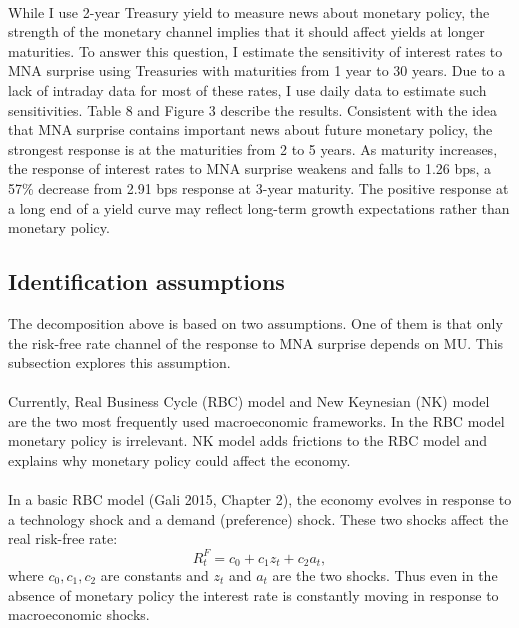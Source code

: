 \documentclass[12pt]{article}
\begin{document}
\paragraph{}
While I use 2-year Treasury yield to measure news about monetary policy, the strength of the monetary channel implies that it should affect yields at longer maturities. To answer this question, I estimate the sensitivity of interest rates to MNA surprise using Treasuries with maturities from 1 year to 30 years. Due to a lack of intraday data for most of these rates, I use daily data to estimate such sensitivities. Table 8 and Figure 3 describe the results. Consistent with the idea that MNA surprise contains important news about future monetary policy, the strongest response is at the maturities from 2 to 5 years. As maturity increases, the response of interest rates to MNA surprise weakens and falls to 1.26 bps, a 57\% decrease from 2.91 bps response at 3-year maturity. The positive response at a long end of a yield curve may reflect long-term growth expectations rather than monetary policy. 


\subsection{Identification assumptions} 
\label{sec:Model}

The decomposition above is based on two assumptions. One of them is that only the risk-free rate channel of the response to MNA surprise depends on MU. This subsection explores this assumption.
\paragraph{}
Currently, Real Business Cycle (RBC) model and New Keynesian (NK) model are the two most frequently used macroeconomic frameworks. In the RBC model monetary policy is irrelevant. NK model adds frictions to the RBC model and explains why monetary policy could affect the economy. 
\paragraph{}
In a basic RBC model (Gali 2015, Chapter 2), the economy evolves in response to a technology shock and a demand (preference) shock. These two shocks affect the real risk-free rate:
\begin{equation}
    R^F_t = c_0 + c_1 z_t + c_2 a_t,
\end{equation}
where $c_0, c_1, c_2$ are constants and $z_t$ and $a_t$ are the two shocks. Thus even in the absence of monetary policy the interest rate is constantly moving in response to macroeconomic shocks. 
\end{document}
